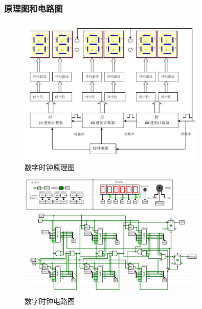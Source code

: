 \documentclass{article}
\begin{document}
    \subsubsection{原理图和电路图}
    \begin{figure}[H]
    \centering
    \includegraphics[width=0.8\textwidth]{2.4.1.png}

    \caption{数字时钟原理图}
    \end{figure}

    \begin{figure}[H]
    \centering
    \includegraphics[width=0.8\textwidth]{2.4.2.png}
    \caption{数字时钟电路图}
    \end{figure}
\end{document}
